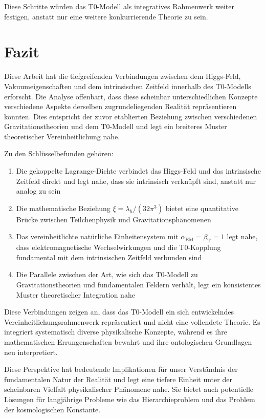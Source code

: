 \documentclass[12pt,a4paper]{article}
\newcommand{\alphaEM}{\alpha_{\text{EM}}}
\newcommand{\betaT}{\beta_{\text{T}}}
\begin{document}
	Diese Schritte würden das T0-Modell als integratives Rahmenwerk weiter festigen, anstatt nur eine weitere konkurrierende Theorie zu sein.
	
	\section{Fazit}
	\label{sec:conclusion}
	
	Diese Arbeit hat die tiefgreifenden Verbindungen zwischen dem Higgs-Feld, Vakuumeigenschaften und dem intrinsischen Zeitfeld innerhalb des T0-Modells erforscht. Die Analyse offenbart, dass diese scheinbar unterschiedlichen Konzepte verschiedene Aspekte derselben zugrundeliegenden Realität repräsentieren könnten. Dies entspricht der zuvor etablierten Beziehung zwischen verschiedenen Gravitationstheorien und dem T0-Modell und legt ein breiteres Muster theoretischer Vereinheitlichung nahe.
	
	Zu den Schlüsselbefunden gehören:
	
	\begin{enumerate}
		\item Die gekoppelte Lagrange-Dichte verbindet das Higgs-Feld und das intrinsische Zeitfeld direkt und legt nahe, dass sie intrinsisch verknüpft sind, anstatt nur analog zu sein
		
		\item Die mathematische Beziehung $\xi = \lambda_h/(32\pi^3)$ bietet eine quantitative Brücke zwischen Teilchenphysik und Gravitationsphänomenen
		
		\item Das vereinheitlichte natürliche Einheitensystem mit $\alphaEM = \betaT = 1$ legt nahe, dass elektromagnetische Wechselwirkungen und die T0-Kopplung fundamental mit dem intrinsischen Zeitfeld verbunden sind
		
		\item Die Parallele zwischen der Art, wie sich das T0-Modell zu Gravitationstheorien und fundamentalen Feldern verhält, legt ein konsistentes Muster theoretischer Integration nahe
	\end{enumerate}
	
	Diese Verbindungen zeigen an, dass das T0-Modell ein sich entwickelndes Vereinheitlichungsrahmenwerk repräsentiert und nicht eine vollendete Theorie. Es integriert systematisch diverse physikalische Konzepte, während es ihre mathematischen Errungenschaften bewahrt und ihre ontologischen Grundlagen neu interpretiert.
	
	Diese Perspektive hat bedeutende Implikationen für unser Verständnis der fundamentalen Natur der Realität und legt eine tiefere Einheit unter der scheinbaren Vielfalt physikalischer Phänomene nahe. Sie bietet auch potentielle Lösungen für langjährige Probleme wie das Hierarchieproblem und das Problem der kosmologischen Konstante.
	
\end{document}
